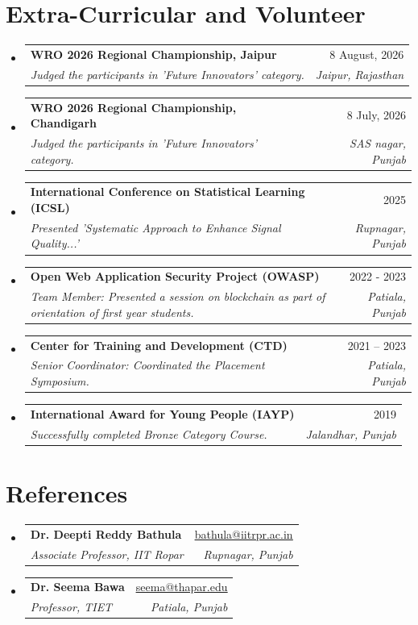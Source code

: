 \documentclass[letterpaper,11pt]{article}
\makeatletter
\newcommand{\resumeSubheading}[4]{
  \vspace{-2pt}\item
    \begin{tabular*}{0.97\textwidth}[t]{l@{\extracolsep{\fill}}r}
      \textbf{#1} & #2 \\
      \textit{\small#3} & \textit{\small #4} \\
    \end{tabular*}\vspace{-7pt}
}
\newcommand{\resumeSubHeadingListStart}{\begin{itemize}[leftmargin=0.15in, label={}]}
\newcommand{\resumeSubHeadingListEnd}{\end{itemize}}
\makeatother
\begin{document}
\section{Extra-Curricular and Volunteer}
\resumeSubHeadingListStart
  \resumeSubheading
    {WRO 2026 Regional Championship, Jaipur}{8 August, 2026}
    {Judged the participants in 'Future Innovators' category.}{Jaipur, Rajasthan} 
  \resumeSubheading
    {WRO 2026 Regional Championship, Chandigarh}{8 July, 2026}
    {Judged the participants in 'Future Innovators' category.}{SAS nagar, Punjab} 
  \resumeSubheading
    {International Conference on Statistical Learning (ICSL)}{2025}
    {Presented 'Systematic Approach to Enhance Signal Quality...'}{Rupnagar, Punjab} 
  \resumeSubheading
    {Open Web Application Security Project (OWASP)}{2022 - 2023}
    {Team Member: Presented a session on blockchain as part of orientation of first year students.}{Patiala, Punjab} 
  \resumeSubheading
    {Center for Training and Development (CTD)}{2021 -- 2023}
    {Senior Coordinator: Coordinated the Placement Symposium.}{Patiala, Punjab} 
  \resumeSubheading
    {International Award for Young People (IAYP)}{2019}
    {Successfully completed Bronze Category Course.}{Jalandhar, Punjab} 
\resumeSubHeadingListEnd

\section{References}
\resumeSubHeadingListStart
  \resumeSubheading
    {Dr. Deepti Reddy Bathula}{\href{mailto:bathula@iitrpr.ac.in}{\underline{bathula@iitrpr.ac.in}}}
    {Associate Professor, IIT Ropar}{Rupnagar, Punjab}
  \resumeSubheading
    {Dr. Seema Bawa}{\href{mailto:seema@thapar.edu}{\underline{seema@thapar.edu}}}
    {Professor, TIET}{Patiala, Punjab}
\resumeSubHeadingListEnd
\end{document}
